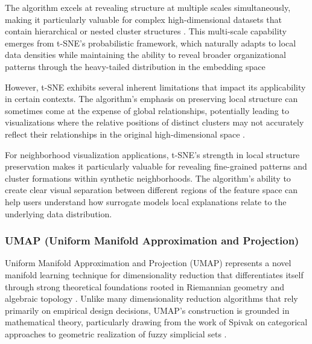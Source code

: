 The algorithm excels at revealing structure at multiple scales simultaneously, making it particularly valuable for complex high-dimensional datasets that contain hierarchical or nested cluster structures \cite{maaten2008tsne}. This multi-scale capability emerges from t-SNE's probabilistic framework, which naturally adapts to local data densities while maintaining the ability to reveal broader organizational patterns through the heavy-tailed distribution in the embedding space

However, t-SNE exhibits several inherent limitations that impact its applicability in certain contexts. The algorithm's emphasis on preserving local structure can sometimes come at the expense of global relationships, potentially leading to visualizations where the relative positions of distinct clusters may not accurately reflect their relationships in the original high-dimensional space \cite{maaten2008tsne}.

For
neighborhood visualization applications, t-SNE's strength in local structure preservation makes it particularly valuable for revealing fine-grained patterns and cluster formations within synthetic neighborhoods. The algorithm's ability to create clear visual separation between different regions of the feature space can help users understand how 
surrogate models
local explanations relate to the underlying data distribution. 


\subsubsection{UMAP (Uniform Manifold Approximation and Projection)}

Uniform Manifold Approximation and Projection (UMAP) represents a novel manifold learning technique for dimensionality reduction that differentiates itself through strong theoretical foundations rooted in Riemannian geometry and algebraic topology \cite{mcinnes2020umap}. Unlike many dimensionality reduction algorithms that rely primarily on empirical design decisions, UMAP's construction is grounded in mathematical theory, particularly drawing from the work of Spivak on categorical approaches to geometric realization of fuzzy simplicial sets \cite{mcinnes2020umap, Spivak2009METRICRO}.

